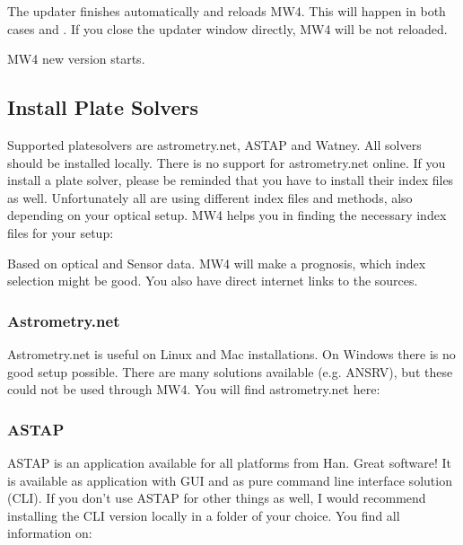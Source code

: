 \documentclass[a4paper,10pt,english]{sphinxmanual}
\begin{document}
\sphinxAtStartPar
The updater finishes automatically and reloads MW4. This will happen in both cases
 and . If you close the updater
window
directly, MW4 will be not reloaded.


\sphinxAtStartPar
MW4 new version starts.

\sphinxstepscope


\subsection{Install Plate Solvers}
\label{\detokenize{install/platesolvers:install-plate-solvers}}\label{\detokenize{install/platesolvers::doc}}
\sphinxAtStartPar
Supported platesolvers are astrometry.net, ASTAP and Watney. All solvers should be
installed locally. There is no support for astrometry.net online. If you install a
plate solver, please be reminded that you have to install their index files as
well. Unfortunately all are using different index files and methods, also
depending on your optical setup. MW4 helps you in finding the necessary index
files for your setup:


\sphinxAtStartPar
Based on optical and Sensor data. MW4 will make a prognosis, which index selection
might be good. You also have direct internet links to the sources.


\subsubsection{Astrometry.net}
\label{\detokenize{install/platesolvers:astrometry-net}}
\sphinxAtStartPar
Astrometry.net is useful on Linux and Mac installations. On Windows there is no
good setup possible. There are many solutions available (e.g. ANSRV), but these
could not be used through MW4. You will find astrometry.net here:

\sphinxAtStartPar
{}


\subsubsection{ASTAP}
\label{\detokenize{install/platesolvers:astap}}
\sphinxAtStartPar
ASTAP is an application available for all platforms from Han. Great software! It
is available as application with GUI and as pure command line interface solution
(CLI). If you don’t use ASTAP for other things as well, I would recommend
installing the CLI version locally in a folder of your choice. You find all
information on:
\end{document}
